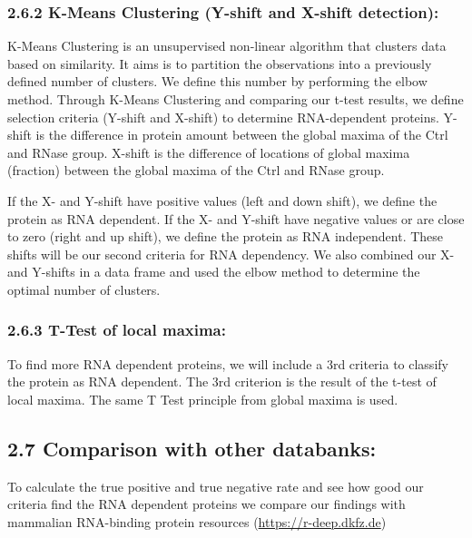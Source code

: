 \documentclass[
]{article}
\begin{document}
\hypertarget{k-means-clustering-y-shift-and-x-shift-detection}{%
\subsubsection{2.6.2 K-Means Clustering (Y-shift and X-shift
detection):}\label{k-means-clustering-y-shift-and-x-shift-detection}}

K-Means Clustering is an unsupervised non-linear algorithm that clusters
data based on similarity. It aims is to partition the observations into
a previously defined number of clusters. We define this number by
performing the elbow method. Through K-Means Clustering and comparing
our t-test results, we define selection criteria (Y-shift and X-shift)
to determine RNA-dependent proteins. Y-shift is the difference in
protein amount between the global maxima of the Ctrl and RNase group.
X-shift is the difference of locations of global maxima (fraction)
between the global maxima of the Ctrl and RNase group.

If the X- and Y-shift have positive values (left and down shift), we
define the protein as RNA dependent. If the X- and Y-shift have negative
values or are close to zero (right and up shift), we define the protein
as RNA independent. These shifts will be our second criteria for RNA
dependency. We also combined our X- and Y-shifts in a data frame and
used the elbow method to determine the optimal number of clusters.

\hypertarget{t-test-of-local-maxima}{%
\subsubsection{2.6.3 T-Test of local
maxima:}\label{t-test-of-local-maxima}}

To find more RNA dependent proteins, we will include a 3rd criteria to
classify the protein as RNA dependent. The 3rd criterion is the result
of the t-test of local maxima. The same T Test principle from global
maxima is used.

\hypertarget{comparison-with-other-databanks}{%
\subsection{2.7 Comparison with other
databanks:}\label{comparison-with-other-databanks}}

To calculate the true positive and true negative rate and see how good
our criteria find the RNA dependent proteins we compare our findings
with mammalian RNA-binding protein resources
(\url{https://r-deep.dkfz.de})
\end{document}
